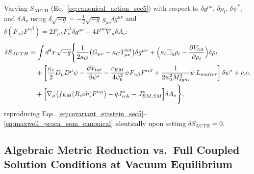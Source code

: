 Varying $S_{\mathrm{AUTH}}$ (Eq.~\eqref{eq:canonical_action_sec5}) with respect to $\delta g^{\mu\nu}$, $\delta\rho_t$, $\delta\psi^*$, and $\delta A_\nu$ using $\delta\sqrt{-g} = -\frac{1}{2}\sqrt{-g}\,g_{\mu\nu}\delta g^{\mu\nu}$ and $\delta(F_{\alpha\beta}F^{\alpha\beta}) = 2 F_{\mu\lambda}F_\nu^{\ \lambda}\delta g^{\mu\nu} + 4 F^{\mu\nu}\nabla_\mu\delta A_\nu$:
\begin{align}
\delta S_{AUTH}
&= \int d^4x\,\sqrt{-g}\Biggl\{
  \frac{1}{2\kappa_G}\bigl(G_{\mu\nu} - \kappa_G T_{\mu\nu}^{tot}\bigr)\delta g^{\mu\nu}
  + \Bigl(\kappa_t\Box_g\rho_t - \frac{\partial V_{tot}}{\partial\rho_t}\Bigr)\delta\rho_t
  \nonumber\\
&\quad + \left[
    \frac{\kappa_c}{2}D_\mu D^\mu\psi
    - \frac{\partial V_{tot}}{\partial\psi^*}
    - \frac{c_{EM}}{4\psi_0^2}\psi F_{\alpha\beta}F^{\alpha\beta}
    + \frac{1}{2\psi_0^2 M_{sym}^2}\psi\,L_{matter}
  \right]\delta\psi^* + c.c.
  \nonumber\\
&\quad + \Bigl[\nabla_\mu\bigl(f_{EM}(R_coh)F^{\nu\mu}\bigr) - \hat{q}J^\nu_{coh} - J^\nu_{EM,SM}\Bigr]\delta A_\nu
\Biggr\},
\label{eq:appD_full_variation}
\end{align}
reproducing Eqs.~\eqref{eq:covariant_einstein_sec5}--\eqref{eq:maxwell_proca_eom_canonical} identically upon setting $\delta S_{\mathrm{AUTH}} = 0$.

\subsection{Algebraic Metric Reduction vs.\ Full Coupled Solution Conditions at Vacuum Equilibrium}

